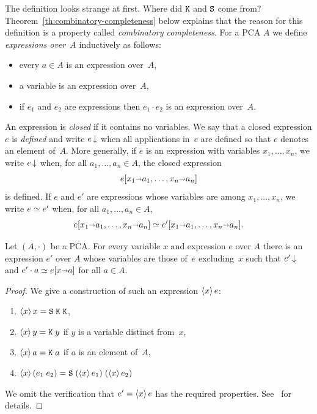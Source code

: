 \noindent
The definition looks strange at first. Where did $\mathtt{K}$ and $\mathtt{S}$
come from? Theorem~\ref{th:combinatory-completeness} below explains
that the reason for this definition is a property called
\emph{combinatory completeness}.
%
For a PCA $A$ we define \emph{expressions over~$A$} inductively as
follows:
%
\begin{itemize}
\item every $a \in A$ is an expression over~$A$,
\item a variable is an expression over~$A$,
\item if $e_1$ and $e_2$ are expressions then $e_1 \cdot e_2$ is an
  expression over~$A$.
\end{itemize}
%
An expression is \emph{closed} if it contains no variables. We say
that a closed expression $e$ is \emph{defined} and write $e\,{\downarrow}$
when all applications in~$e$ are defined so that $e$ denotes an
element of~$A$. More generally, if $e$ is an expression with variables
$x_1, \ldots, x_n$, we write $e\,{\downarrow}$ when, for all $a_1, \ldots,
a_n \in A$, the closed expression
%
\begin{equation*}
  e[x_1 {\shortrightarrow} a_1, \ldots, x_n {\shortrightarrow} a_n]
\end{equation*}
%
is defined. If $e$ and $e'$ are expressions whose variables are among
$x_1, \ldots, x_n$, we write $e \simeq e'$ when, for all $a_1, \ldots,
a_n \in A$,
%
\begin{equation*}
  e[x_1 {\shortrightarrow} a_1, \ldots, x_n {\shortrightarrow} a_n] \simeq
  e'[x_1 {\shortrightarrow} a_1, \ldots, x_n {\shortrightarrow} a_n].
\end{equation*}

\begin{theorem}
  \label{th:combinatory-completeness}
  Let $(A, {\cdot})$ be a PCA. For every variable $x$ and expression
  $e$ over $A$ there is an expression $e'$ over $A$ whose variables
  are those of~$e$ excluding~$x$ such that $e'\,{\downarrow}$ and $e'
  \cdot a \simeq e[x {\shortrightarrow} a]$ for all $a \in A$.
\end{theorem}

\begin{proof}
  We give a construction of such an expression $\langle x \rangle\,e$:
  \begin{enumerate}
  \item $\langle x \rangle\,x = \mathtt{S}\; \mathtt{K}\; \mathtt{K}$,
  \item $\langle x \rangle\,y = \mathtt{K}\; y$ if $y$ is a variable distinct from~$x$,
  \item $\langle x \rangle\,a = \mathtt{K}\; a$ if $a$ is an element of~$A$,
  \item $\langle x \rangle\,(e_1\; e_2) = \mathtt{S}\; (\langle x \rangle\,e_1)\; (\langle x \rangle\,e_2)$
  \end{enumerate}
  We omit the verification that $e' = \langle x \rangle\,e$ has the required
  properties. See~\cite{LongleyJ:reatls} for details.
\end{proof}

